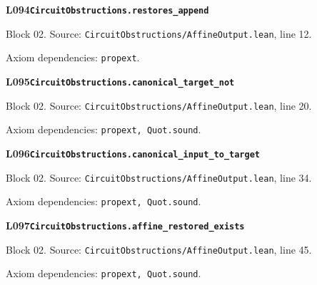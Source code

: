 \begin{minipage}{\linewidth}
\hypertarget{L094}{}
{\small\sffamily\bfseries\color{ink}L094\quad\nolinkurl{CircuitObstructions.restores_append}}\par
{\scriptsize\sffamily\color{muted}Block 02. Source: \nolinkurl{CircuitObstructions/AffineOutput.lean}, line 12.}\par
{}
{\scriptsize\sffamily\color{muted}Axiom dependencies: \nolinkurl{propext}.}
\end{minipage}\par\medskip
\begin{minipage}{\linewidth}
\hypertarget{L095}{}
{\small\sffamily\bfseries\color{ink}L095\quad\nolinkurl{CircuitObstructions.canonical_target_not}}\par
{\scriptsize\sffamily\color{muted}Block 02. Source: \nolinkurl{CircuitObstructions/AffineOutput.lean}, line 20.}\par
{}
{\scriptsize\sffamily\color{muted}Axiom dependencies: \nolinkurl{propext, Quot.sound}.}
\end{minipage}\par\medskip
\begin{minipage}{\linewidth}
\hypertarget{L096}{}
{\small\sffamily\bfseries\color{ink}L096\quad\nolinkurl{CircuitObstructions.canonical_input_to_target}}\par
{\scriptsize\sffamily\color{muted}Block 02. Source: \nolinkurl{CircuitObstructions/AffineOutput.lean}, line 34.}\par
{}
{\scriptsize\sffamily\color{muted}Axiom dependencies: \nolinkurl{propext, Quot.sound}.}
\end{minipage}\par\medskip
\begin{minipage}{\linewidth}
\hypertarget{L097}{}
{\small\sffamily\bfseries\color{ink}L097\quad\nolinkurl{CircuitObstructions.affine_restored_exists}}\par
{\scriptsize\sffamily\color{muted}Block 02. Source: \nolinkurl{CircuitObstructions/AffineOutput.lean}, line 45.}\par
{}
{\scriptsize\sffamily\color{muted}Axiom dependencies: \nolinkurl{propext, Quot.sound}.}
\end{minipage}\par\medskip
